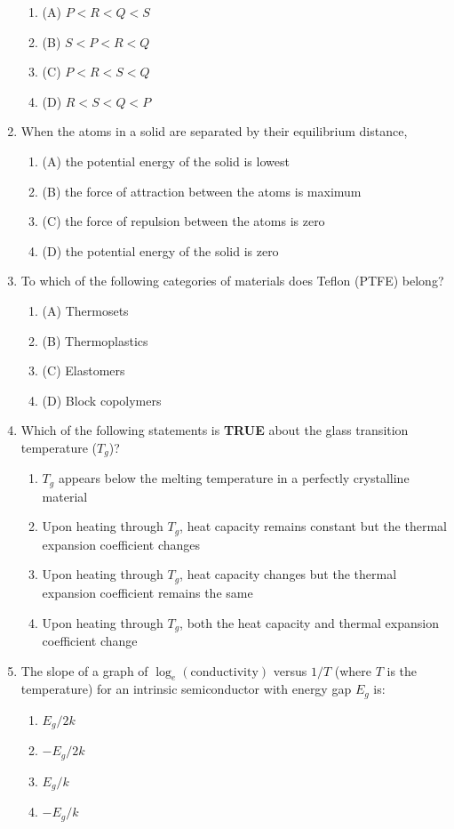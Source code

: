 \documentclass[article]{IEEEtran}
\numberwithin{figure}{enumi}
\begin{document}
\begin{enumerate}
\begin{enumerate}
    \item (A) $P < R < Q < S$
    \item (B) $S < P < R < Q$
    \item (C) $P < R < S < Q$
    \item (D) $R < S < Q < P$
\end{enumerate}
\item When the atoms in a solid are separated by their equilibrium distance,
\begin{enumerate}
    \item (A) the potential energy of the solid is lowest
    \item (B) the force of attraction between the atoms is maximum
    \item (C) the force of repulsion between the atoms is zero
    \item (D) the potential energy of the solid is zero
\end{enumerate}
\item To which of the following categories of materials does Teflon (PTFE) belong?
\begin{enumerate}
    \item (A) Thermosets
    \item (B) Thermoplastics
    \item (C) Elastomers
    \item (D) Block copolymers
\end{enumerate}

\item Which of the following statements is \textbf{TRUE} about the glass transition temperature ($T_g$)?
    \begin{enumerate}
        \item $T_g$ appears below the melting temperature in a perfectly crystalline material
        \item Upon heating through $T_g$, heat capacity remains constant but the thermal expansion coefficient changes
        \item Upon heating through $T_g$, heat capacity changes but the thermal expansion coefficient remains the same
        \item Upon heating through $T_g$, both the heat capacity and thermal expansion coefficient change
    \end{enumerate}
   
\item The slope of a graph of $\log_e(\text{conductivity})$ versus $1/T$ (where $T$ is the temperature) for an intrinsic semiconductor with energy gap $E_g$ is:
    \begin{enumerate}
        \item $E_g / 2k$
        \item $-E_g / 2k$
        \item $E_g / k$
        \item $-E_g / k$
    \end{enumerate}
   

\end{enumerate}
\end{document}
